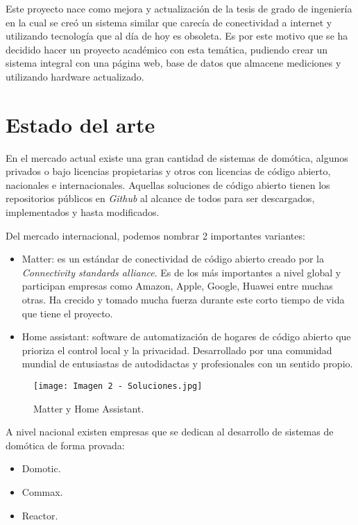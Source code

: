 Este proyecto nace como mejora y actualización de la tesis de grado de ingeniería en la cual se creó un sistema similar que carecía de conectividad a internet y utilizando tecnología que al día de hoy es obsoleta. Es por este motivo que se ha decidido hacer un proyecto académico con esta temática, pudiendo crear un sistema integral con una página web, base de datos que almacene mediciones y utilizando hardware actualizado.

\section{Estado del arte}

En el mercado actual existe una gran cantidad de sistemas de domótica, algunos privados o bajo licencias propietarias y otros con licencias de código abierto, nacionales e internacionales. Aquellas soluciones de código abierto tienen los repositorios públicos en \textit{Github} al alcance de todos para ser descargados, implementados y hasta modificados.

Del mercado internacional, podemos nombrar 2 importantes variantes:
\begin{itemize}
	\item Matter: es un estándar de conectividad de código abierto creado por la \textit{Connectivity standards alliance}. Es de los más importantes a nivel global y participan empresas como Amazon, Apple, Google, Huawei entre muchas otras. Ha crecido y tomado mucha fuerza durante este corto tiempo de vida que tiene el proyecto. \citep{3}
	\item Home assistant: software de automatización de hogares de código abierto que prioriza el control local y la privacidad. Desarrollado por una comunidad mundial de entusiastas de autodidactas y profesionales con un sentido propio. \citep{4}
\end{itemize}

\begin{figure}[h]
\centering
\texttt{[image: Imagen 2 - Soluciones.jpg]}
\caption[Matter y Home Assistant]{Matter y Home Assistant. \footnotemark}
\label{fig:1}
\end{figure}

A nivel nacional existen empresas que se dedican al desarrollo de sistemas de domótica de forma provada:
\begin{itemize}
	\item Domotic. \citep{5}
	\item Commax. \citep{6}
	\item Reactor. \citep{7}
\end{itemize}

